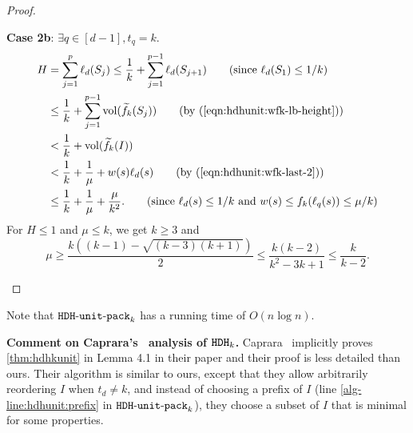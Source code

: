 \begin{proof}
\begin{optional}
\textbf{Case 2b}: $\exists q \in [d-1], t_q = k$.
\begin{align*}
H &= \sum_{j=1}^p \ell_d(S_j)
\le \frac{1}{k} + \sum_{j=1}^{p-1} \ell_d(S_{j+1})
\tag{since $\ell_d(S_1) \le 1/k$}
\\ &\le \frac{1}{k} + \sum_{j=1}^{p-1} \vol(\wfk(S_j))
\tag{by (\ref{eqn:hdhunit:wfk-lb-height})}
\\ &< \frac{1}{k} + \vol(\wfk(I))
\\ &< \frac{1}{k} + \frac{1}{\mu} + w(s)\ell_d(s)
\tag{by (\ref{eqn:hdhunit:wfk-last-2})}
\\ &\le \frac{1}{k} + \frac{1}{\mu} + \frac{\mu}{k^2}.
\tag{since $\ell_d(s) \le 1/k$ and $w(s) \le f_k(\ell_q(s)) \le \mu/k$}
\end{align*}
For $H \le 1$ and $\mu \le k$, we get $k \ge 3$ and
\[ \mu \ge \frac{k((k-1) - \sqrt{(k-3)(k+1)})}{2}
    \le \frac{k(k-2)}{k^2-3k+1} \le \frac{k}{k-2}. \]
\end{optional}
\end{proof}

Note that $\operatorname{\mathtt{HDH-unit-pack}}_{k}$ has a running time of $O(n\log n)$.

\textbf{Comment on Caprara's~\cite{caprara2008} analysis of $\operatorname{\mathtt{HDH}}_{k}$.}
Caprara~\cite{caprara2008} implicitly proves \cref{thm:hdhkunit} in Lemma 4.1 in their paper
and their proof is less detailed than ours.
Their algorithm is similar to ours, except that
they allow arbitrarily reordering $I$ when $t_d \neq k$,
and instead of choosing a prefix of $I$
(line \ref{alg-line:hdhunit:prefix} in $\operatorname{\mathtt{HDH-unit-pack}}_{k}$),
they choose a subset of $I$ that is minimal for some properties.
